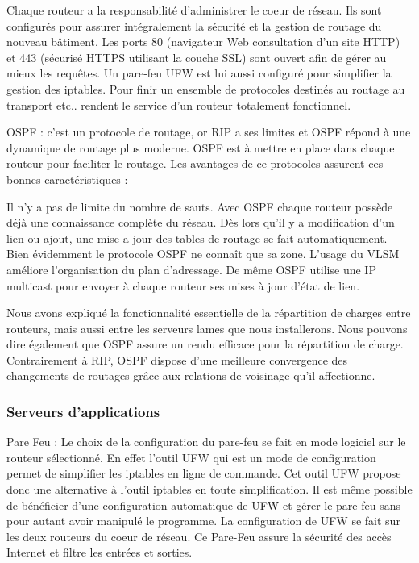 Chaque routeur a la responsabilité d'administrer le coeur de réseau. Ils sont configurés pour assurer intégralement la sécurité et la gestion de routage du nouveau bâtiment.
Les ports 80 (navigateur Web consultation d'un site HTTP)  et 443 (sécurisé HTTPS utilisant la couche SSL) sont ouvert afin de gérer au mieux les requêtes. Un pare-feu UFW est lui aussi configuré pour simplifier la gestion des iptables. Pour finir un ensemble de protocoles destinés au routage au transport etc.. rendent le service d'un routeur totalement fonctionnel.

OSPF :
c'est un protocole de routage, or RIP a ses limites et OSPF répond à une dynamique de routage plus moderne. OSPF est à mettre en place dans chaque routeur pour faciliter le routage.
Les avantages de ce protocoles assurent ces bonnes caractéristiques :

Il n'y a pas de limite du nombre de sauts. Avec OSPF chaque routeur possède déjà une connaissance complète du réseau. Dès lors qu'il y a modification d'un lien ou ajout, une mise a jour des tables de routage se fait automatiquement.
Bien évidemment le protocole OSPF ne connaît que sa zone.
L'usage du VLSM améliore l'organisation du plan d'adressage. De même OSPF utilise une IP multicast pour envoyer à chaque routeur ses mises à jour d'état de lien.

Nous avons expliqué la fonctionnalité essentielle de la répartition de charges entre routeurs, mais aussi entre les serveurs lames que nous installerons. Nous pouvons dire également que OSPF assure un rendu efficace pour la répartition de charge. Contrairement à RIP, OSPF dispose d'une meilleure convergence des changements de routages grâce aux relations de voisinage qu'il affectionne.

%
\subsubsection{Serveurs d'applications}

Pare Feu :
Le choix de la configuration du pare-feu se fait en mode logiciel sur le routeur sélectionné.
En effet l'outil UFW qui est un mode de configuration permet de simplifier les iptables en ligne de commande.
Cet outil UFW propose donc une alternative à l'outil iptables en toute simplification.
Il est même possible de bénéficier d'une configuration automatique de UFW et gérer le pare-feu sans pour autant avoir manipulé le programme.
La configuration de UFW se fait sur les deux routeurs du coeur de réseau. Ce Pare-Feu assure la sécurité des accès Internet et filtre les entrées et sorties.

